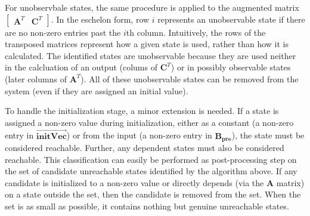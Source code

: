 For unobservbale states, the same procedure is applied to the
augmented matrix $\left [\begin{array} {cc} \mathbf{A}^T &
\mathbf{C}^T \end{array} \right ]$.  In the eschelon form, row $i$
represents an unobservable state if there are no non-zero entries past
the $i$th column.  Intuitively, the rows of the transposed matrices
represent how a given state is used, rather than how it is calculated.
The identified states are unobservable because they are used neither
in the calcluation of an output (colums of $\mathbf{C}^T$) or in
possibly observable states (later columns of $\mathbf{A}^T$).  All of
these unobservable states can be removed from the system (even if they
are assigned an initial value).

To handle the initialization stage, a minor extension is needed.  If a
state is assigned a non-zero value during initialization, either as a
constant (a non-zero entry in $\overrightarrow{\mathbf{initVec}}$) or
from the input (a non-zero entry in $\mathbf{B_{pre}}$), the state
must be considered reachable.  Further, any dependent states must also
be considered reachable.  This classification can easily be performed
as post-processing step on the set of candidate unreachable states
identified by the algorithm above.  If any candidate is initialized to
a non-zero value or directly depends (via the $\mathbf{A}$ matrix) on
a state outside the set, then the candidate is removed from the set.
When the set is as small as possible, it contains nothing but genuine
unreachable states.


